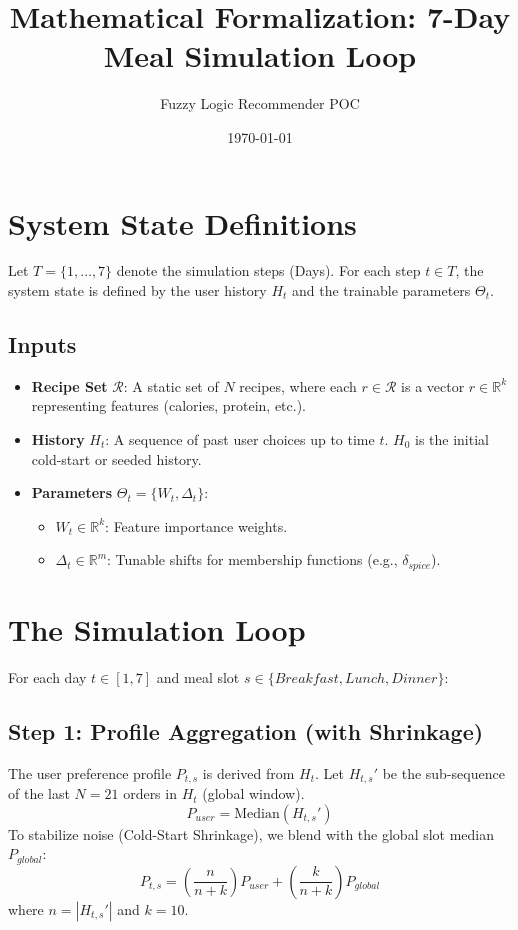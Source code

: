 \documentclass{article}
\title{Mathematical Formalization: 7-Day Meal Simulation Loop}
\author{Fuzzy Logic Recommender POC}
\date{\today}
\begin{document}
\maketitle

\section{System State Definitions}
Let $T = \{1, \dots, 7\}$ denote the simulation steps (Days). For each step $t \in T$, the system state is defined by the user history $H_t$ and the trainable parameters $\Theta_t$.

\subsection{Inputs}
\begin{itemize}
    \item \textbf{Recipe Set} $\mathcal{R}$: A static set of $N$ recipes, where each $r \in \mathcal{R}$ is a vector $r \in \mathbb{R}^k$ representing features (calories, protein, etc.).
    \item \textbf{History} $H_t$: A sequence of past user choices up to time $t$. $H_0$ is the initial cold-start or seeded history.
    \item \textbf{Parameters} $\Theta_t = \{W_t, \Delta_t\}$:
    \begin{itemize}
        \item $W_t \in \mathbb{R}^k$: Feature importance weights.
        \item $\Delta_t \in \mathbb{R}^m$: Tunable shifts for membership functions (e.g., $\delta_{spice}$).
    \end{itemize}
\end{itemize}

\section{The Simulation Loop}
For each day $t \in [1, 7]$ and meal slot $s \in \{Breakfast, Lunch, Dinner\}$:

\subsection{Step 1: Profile Aggregation (with Shrinkage)}
The user preference profile $P_{t,s}$ is derived from $H_t$.
Let $H_{t,s}'$ be the sub-sequence of the last $N=21$ orders in $H_t$ (global window).
\begin{equation}
P_{user} = \text{Median}(H_{t,s}')
\end{equation}
To stabilize noise (Cold-Start Shrinkage), we blend with the global slot median $P_{global}$:
\begin{equation}
P_{t,s} = \left(\frac{n}{n+k}\right) P_{user} + \left(\frac{k}{n+k}\right) P_{global}
\end{equation}
where $n = |H_{t,s}'|$ and $k=10$.
\end{document}
